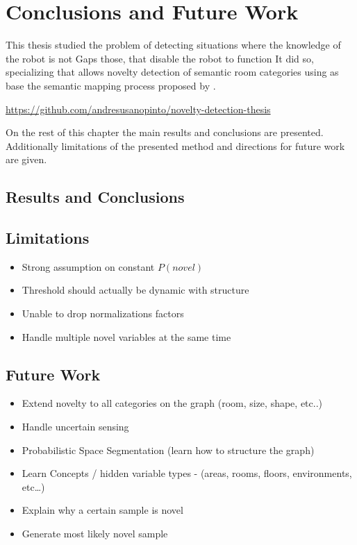 \chapter{Conclusions and Future Work}\label{chap:conclusions}

This thesis studied the problem of detecting situations where the knowledge of the robot
is not 
Gaps those, that disable the robot to function 
It did so, specializing 
that allows novelty detection of semantic room
categories using as base the semantic mapping process proposed by \cite{pronobis2011semmap}.


\url{https://github.com/andresusanopinto/novelty-detection-thesis}

On the rest of this chapter the main results and conclusions are presented.
Additionally limitations of the presented method and directions for future work are given.



\section{Results and Conclusions}

\section{Limitations}

\begin{itemize}
\item Strong assumption on constant $P(novel)$
\item Threshold should actually be dynamic with structure
\item Unable to drop normalizations factors
\item Handle multiple novel variables at the same time
\end{itemize}
 

\section{Future Work}

\begin{itemize}
\item Extend novelty to all categories on the graph (room, size, shape, etc..)
\item Handle uncertain sensing
\item Probabilistic Space Segmentation (learn how to structure the graph)
\item Learn Concepts / hidden variable types - (areas, rooms, floors, environments, etc\dots)
\item Explain why a certain sample is novel
\item Generate most likely novel sample
\end{itemize}

